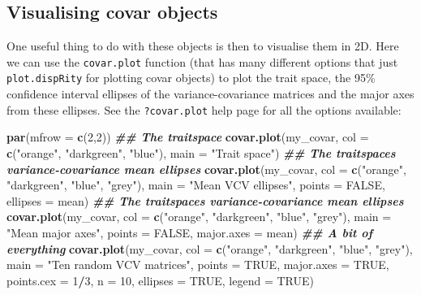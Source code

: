 \documentclass[
]{book}
\newenvironment{Shaded}{\begin{snugshade}}{\end{snugshade}}
\newcommand{\AttributeTok}[1]{\textcolor[rgb]{0.13,0.29,0.53}{#1}}
\newcommand{\ConstantTok}[1]{\textcolor[rgb]{0.56,0.35,0.01}{#1}}
\newcommand{\DecValTok}[1]{\textcolor[rgb]{0.00,0.00,0.81}{#1}}
\newcommand{\DocumentationTok}[1]{\textcolor[rgb]{0.56,0.35,0.01}{\textbf{\textit{#1}}}}
\newcommand{\FunctionTok}[1]{\textcolor[rgb]{0.13,0.29,0.53}{\textbf{#1}}}
\newcommand{\NormalTok}[1]{#1}
\newcommand{\SpecialCharTok}[1]{\textcolor[rgb]{0.81,0.36,0.00}{\textbf{#1}}}
\newcommand{\StringTok}[1]{\textcolor[rgb]{0.31,0.60,0.02}{#1}}
\begin{document}
\hypertarget{visualising-covar-objects}{%
\subsection{Visualising covar objects}\label{visualising-covar-objects}}

One useful thing to do with these objects is then to visualise them in 2D.
Here we can use the \texttt{covar.plot} function (that has many different options that just \texttt{plot.dispRity} for plotting covar objects) to plot the trait space, the 95\% confidence interval ellipses of the variance-covariance matrices and the major axes from these ellipses.
See the \texttt{?covar.plot} help page for all the options available:

\begin{Shaded}
\begin{Highlighting}[]
\FunctionTok{par}\NormalTok{(}\AttributeTok{mfrow =} \FunctionTok{c}\NormalTok{(}\DecValTok{2}\NormalTok{,}\DecValTok{2}\NormalTok{))}
\DocumentationTok{\#\# The traitspace}
\FunctionTok{covar.plot}\NormalTok{(my\_covar, }\AttributeTok{col =} \FunctionTok{c}\NormalTok{(}\StringTok{"orange"}\NormalTok{, }\StringTok{"darkgreen"}\NormalTok{, }\StringTok{"blue"}\NormalTok{), }\AttributeTok{main =} \StringTok{"Trait space"}\NormalTok{)}
\DocumentationTok{\#\# The traitspace\textquotesingle{}s variance{-}covariance mean ellipses}
\FunctionTok{covar.plot}\NormalTok{(my\_covar, }\AttributeTok{col =} \FunctionTok{c}\NormalTok{(}\StringTok{"orange"}\NormalTok{, }\StringTok{"darkgreen"}\NormalTok{, }\StringTok{"blue"}\NormalTok{, }\StringTok{"grey"}\NormalTok{), }\AttributeTok{main =} \StringTok{"Mean VCV ellipses"}\NormalTok{,}
           \AttributeTok{points =} \ConstantTok{FALSE}\NormalTok{, }\AttributeTok{ellipses =}\NormalTok{ mean) }
\DocumentationTok{\#\# The traitspace\textquotesingle{}s variance{-}covariance mean ellipses}
\FunctionTok{covar.plot}\NormalTok{(my\_covar, }\AttributeTok{col =} \FunctionTok{c}\NormalTok{(}\StringTok{"orange"}\NormalTok{, }\StringTok{"darkgreen"}\NormalTok{, }\StringTok{"blue"}\NormalTok{, }\StringTok{"grey"}\NormalTok{), }\AttributeTok{main =} \StringTok{"Mean major axes"}\NormalTok{,}
           \AttributeTok{points =} \ConstantTok{FALSE}\NormalTok{, }\AttributeTok{major.axes =}\NormalTok{ mean)}
\DocumentationTok{\#\# A bit of everything}
\FunctionTok{covar.plot}\NormalTok{(my\_covar, }\AttributeTok{col =} \FunctionTok{c}\NormalTok{(}\StringTok{"orange"}\NormalTok{, }\StringTok{"darkgreen"}\NormalTok{, }\StringTok{"blue"}\NormalTok{, }\StringTok{"grey"}\NormalTok{), }\AttributeTok{main =} \StringTok{"Ten random VCV matrices"}\NormalTok{,}
           \AttributeTok{points =} \ConstantTok{TRUE}\NormalTok{, }\AttributeTok{major.axes =} \ConstantTok{TRUE}\NormalTok{, }\AttributeTok{points.cex =} \DecValTok{1}\SpecialCharTok{/}\DecValTok{3}\NormalTok{, }\AttributeTok{n =} \DecValTok{10}\NormalTok{, }\AttributeTok{ellipses =} \ConstantTok{TRUE}\NormalTok{, }\AttributeTok{legend =} \ConstantTok{TRUE}\NormalTok{)}
\end{Highlighting}
\end{Shaded}
\end{document}
